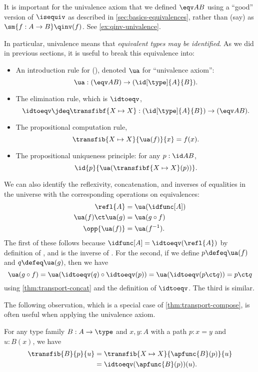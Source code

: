 \begin{rmk}
  It is important for the univalence axiom that we defined $\eqv AB$ using a ``good'' version of $\isequiv$ as described in \cref{sec:basics-equivalences}, rather than (say) as $\sm{f:A\to B} \qinv(f)$.
  See \cref{ex:qinv-univalence}.
\end{rmk}

In particular, univalence means that \emph{equivalent types may be identified}.
As we did in previous sections, it is useful to break this equivalence into:
%
\begin{itemize}
\item An introduction rule for {()}, denoted $\ua$ for ``univalence axiom'':
  \[
  \ua : ({\eqv A B}) \to (\id[\type]{A}{B}).
  \]
\item The elimination rule, which is $\idtoeqv$,
  \[
  \idtoeqv \jdeq \transfibf{X \mapsto X} : (\id[\type]{A}{B}) \to (\eqv A B).
  \]
\item The propositional computation rule,
  \[
  \transfib{X \mapsto X}{\ua(f)}{x} = f(x).
  \]
\item The propositional uniqueness principle: 
  for any $p : \id A B$,
  \[
  \id{p}{\ua(\transfibf{X \mapsto X}(p))}.
  \]
\end{itemize}
%
We can also identify the reflexivity, concatenation, and inverses of equalities in the universe with the corresponding operations on equivalences:
\begin{align*}
  \refl{A} &= \ua(\idfunc[A]) \\
  \ua(f) \ct \ua(g) &= \ua(g\circ f) \\
  \opp{\ua(f)} &= \ua(f^{-1}).
\end{align*}
The first of these follows because $\idfunc[A] = \idtoeqv(\refl{A})$ by definition of \idtoeqv, and \ua is the inverse of \idtoeqv.
For the second, if we define $p \defeq \ua(f)$ and $q\defeq \ua(g)$, then we have
\[ \ua(g\circ f) = \ua(\idtoeqv(q) \circ \idtoeqv(p)) = \ua(\idtoeqv(p\ct q)) = p\ct q\]
using \cref{thm:transport-concat} and the definition of $\idtoeqv$.
The third is similar.

The following observation, which is a special case of \cref{thm:transport-compose}, is often useful when applying the univalence axiom.

\begin{lem}\label{thm:transport-is-ap}
  For any type family $B:A\to\type$ and $x,y:A$ with a path $p:x=y$ and $u:B(x)$, we have
  \begin{align*}
    \transfib{B}{p}{u} &= \transfib{X\mapsto X}{\apfunc{B}(p)}{u}\\
    &= \idtoeqv(\apfunc{B}(p))(u).
  \end{align*}
\end{lem}

